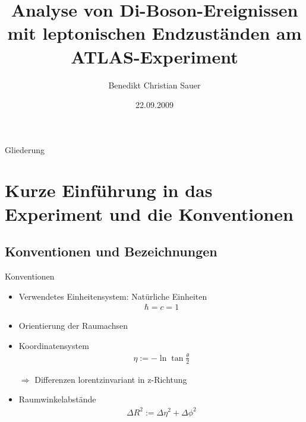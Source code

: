 \documentclass{beamer}
\title[Analyse von Di-Boson-Ereignissen]{Analyse von Di-Boson-Ereignissen mit
leptonischen Endzuständen am ATLAS-Experiment
}
\author[B. Sauer]{Benedikt Christian Sauer}
\institute{Bachelorarbeit am Physikalischen Institut der Universität Bonn}
\date{22.09.2009}
\begin{document}
\begin{frame}
  \titlepage
\end{frame}

\begin{frame}{Gliederung}
  \tableofcontents[pausesections]
\end{frame}

\section[Einführung]{Kurze Einführung in das Experiment und die Konventionen}
\subsection{Konventionen und Bezeichnungen}
\begin{frame}{Konventionen}
  \begin{itemize}
    \item Verwendetes Einheitensystem: Natürliche Einheiten
      \begin{align*}
        \hbar = c = 1
      \end{align*} \pause
    \item Orientierung der Raumachsen \pause
    \item Koordinatensystem
      \pause
      \begin{align*}
        \eta := -\ln{\tan{\frac \theta 2}}
      \end{align*}
    \item[$\Rightarrow$] Differenzen lorentzinvariant in z-Richtung
      \pause
    \item Raumwinkelabstände
      \begin{align*}
        \Delta R^2 := \Delta\eta^2 + \Delta\phi^2
      \end{align*}
  \end{itemize}
\end{frame}
\end{document}
